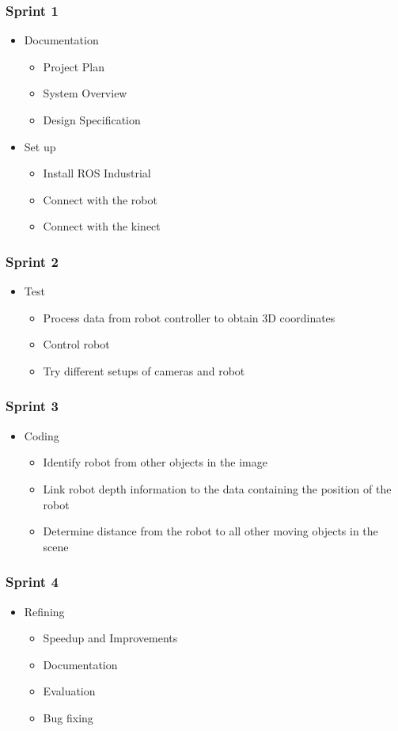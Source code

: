 \documentclass[10pt,a4paper]{article}
\begin{document}
\subsubsection*{Sprint 1}
\begin{itemize}
  \item Documentation
	\begin{itemize}
	\item Project Plan
	\item System Overview
	\item Design Specification
	\end{itemize}
	\item Set up
	\begin{itemize}
	\item Install ROS Industrial
	\item Connect with the robot
	\item Connect with the kinect
	\end{itemize}
\end{itemize}
\subsubsection*{Sprint 2}
\begin{itemize}
\item Test
\begin{itemize}
\item Process data from robot controller to obtain 3D coordinates
\item Control robot
\item Try different setups of cameras and robot
\end{itemize}
\end{itemize}
\subsubsection*{Sprint 3}
\begin{itemize}
\item Coding
\begin{itemize}
\item Identify robot from other objects in the image
\item Link robot depth information to the data containing the position of the robot
\item Determine distance from the robot to all other moving objects in the scene
\end{itemize}
\end{itemize}
\subsubsection*{Sprint 4}
\begin{itemize}
\item Refining
\begin{itemize}
\item Speedup and Improvements
\item Documentation
\item Evaluation
\item Bug fixing
\end{itemize}
\end{itemize}
\end{document}
